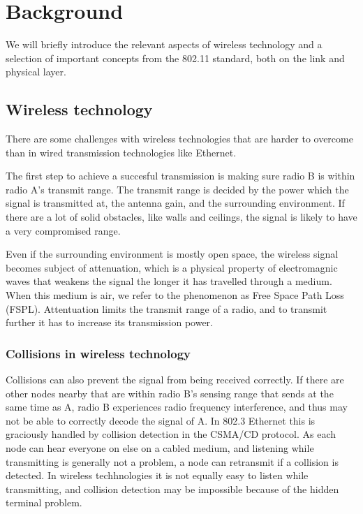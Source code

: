 \chapter{Background}
We will briefly introduce the relevant aspects of wireless technology and a selection of important
concepts from the 802.11 standard, both on the link and physical layer.

\section{Wireless technology}
There are some challenges with wireless technologies that are harder to overcome than in wired transmission technologies like Ethernet.

The first step to achieve a succesful transmission is making sure radio B is within radio A's transmit range. The
transmit range is decided by the power which the signal is transmitted at, the antenna gain, and the surrounding 
environment. If there are a lot of solid obstacles, like walls and ceilings, the signal is likely to have a very compromised range.

Even if the surrounding environment is mostly open space, the wireless signal becomes subject of attenuation,
     which is a physical property of electromagnic waves that weakens the signal the longer it has travelled through a
     medium. When this medium is air, we refer to the phenomenon as Free Space Path Loss (FSPL). Attentuation limits
     the transmit range of a radio, and to transmit further it has to increase its transmission power.

     \subsection{Collisions in wireless technology}
     Collisions can also prevent the signal from being received correctly.
     If there are other nodes nearby that are within radio B's sensing range that sends at the same time as A, 
     radio B experiences radio frequency interference, and thus may not be able to correctly decode the signal of A. In 802.3 Ethernet this
     is graciously handled by collision detection in the CSMA/CD protocol. As each node can hear everyone on else on a cabled medium,
     and listening while transmitting is generally not a problem, a node can retransmit if a collision is detected. In wireless techhnologies
     it is not equally easy to listen while transmitting, and collision detection may be impossible because of the hidden terminal problem.

